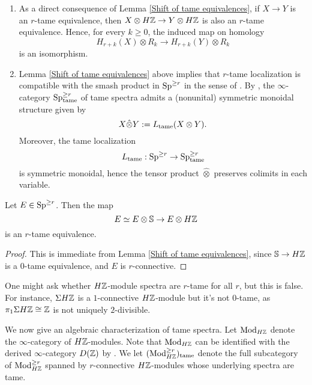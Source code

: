 \begin{remark}
\label{symmetric monoidal structure on tame spectra}
\begin{enumerate}
 	\item As a direct consequence of Lemma \ref{Shift of tame equivalences}, if $X\to Y$ is an $r$-tame equivalence, then $X\otimes H{\mathbb{Z}} \to Y\otimes H{\mathbb{Z}}$ is also an $r$-tame equivalence. Hence, for every $k\geq 0$, the induced map on homology
 	\[
 	H_{r+k}(X)\otimes R_{k}
 	\to
 	H_{r+k}(Y)\otimes R_{k}
 	\]
 	is an isomorphism.
	\item Lemma \ref{Shift of tame equivalences} above implies that $r$-tame localization is compatible with the smash product in $\operatorname{Sp}^{\geq r}$ in the sense of \cite[Definition 2.2.1.6.]{HA}. By \cite[Proposition 2.2.1.9.]{HA}, the $\infty$-category $\operatorname{Sp}^{\geq r}_{\operatorname{\operatorname{tame}}}$ of tame spectra admits a (nonunital) symmetric monoidal structure given by 
$$
X\hat{\otimes} Y := L_{\operatorname{\operatorname{tame}}}(X\otimes Y).
$$
Moreover, the tame localization 
$$
L_{\operatorname{\operatorname{tame}}}: \operatorname{Sp}^{\geq r} \to 
\operatorname{Sp}^{\geq r}_{\operatorname{\operatorname{tame}}}
$$
is symmetric monoidal, hence the tensor product $\hat{\otimes}$ preserves colimits in each variable.
\end{enumerate}

\end{remark}

\begin{corollary}
\label{HZ commutes with tame localization}
	Let $E\in \operatorname{Sp}^{\geq r}$. Then the map
	$$
	E \simeq E\otimes {\mathbb{S}}  \to E\otimes H{\mathbb{Z}}
	$$ 
	is an $r$-tame equivalence.
\end{corollary}
\begin{proof}
	This is immediate from Lemma \ref{Shift of tame equivalences}, since ${\mathbb{S}} \to H{\mathbb{Z}}$ is a $0$-tame equivalence, and $E$ is $r$-connective.
\end{proof}


\begin{remark}
One might ask whether $H{\mathbb{Z}}$-module spectra are $r$-tame for all $r$, but this is false. For instance, $\Sigma H{\mathbb{Z}}$ is a $1$-connective $H{\mathbb{Z}}$-module but it's not $0$-tame, as $\pi_{1}\Sigma H{\mathbb{Z}}\cong {\mathbb{Z}}$ is not uniquely $2$-divisible.
\end{remark}

We now give an algebraic characterization of tame spectra. 
Let $\operatorname{Mod}_{H{\mathbb{Z}}}$ denote the $\infty$-category of $H{\mathbb{Z}}$-modules. Note that $\operatorname{Mod}_{H{\mathbb{Z}}}$ can be identified with the derived $\infty$-category $D({\mathbb{Z}})$ by \cite[Remark 7.1.1.16.]{HA}.
We let $(\operatorname{Mod}^{\geq r}_{H{\mathbb{Z}}})_{\operatorname{\operatorname{tame}}}$ denote the full subcategory of $\operatorname{Mod}^{\geq r}_{H{\mathbb{Z}}}$
spanned by $r$-connective $H{\mathbb{Z}}$-modules whose underlying spectra are tame.

